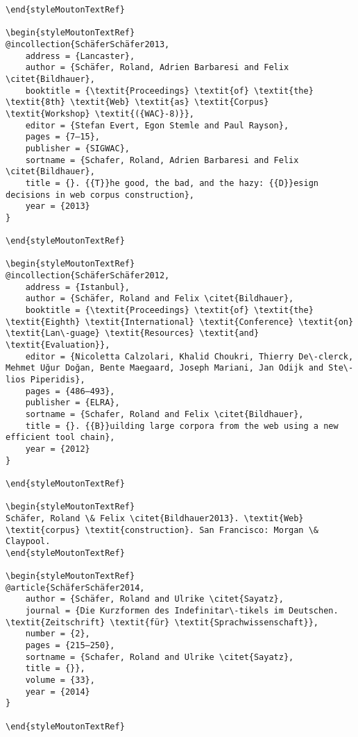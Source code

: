 \begin{styleMoutonHeadingRef}
\begin{verbatim}
\end{styleMoutonTextRef}

\begin{styleMoutonTextRef}
@incollection{SchäferSchäfer2013,
	address = {Lancaster},
	author = {Schäfer, Roland, Adrien Barbaresi and Felix \citet{Bildhauer},
	booktitle = {\textit{Proceedings} \textit{of} \textit{the} \textit{8th} \textit{Web} \textit{as} \textit{Corpus} \textit{Workshop} \textit{({WAC}-8)}},
	editor = {Stefan Evert, Egon Stemle and Paul Rayson},
	pages = {7–15},
	publisher = {SIGWAC},
	sortname = {Schafer, Roland, Adrien Barbaresi and Felix \citet{Bildhauer},
	title = {}. {{T}}he good, the bad, and the hazy: {{D}}esign decisions in web corpus construction},
	year = {2013}
}

\end{styleMoutonTextRef}

\begin{styleMoutonTextRef}
@incollection{SchäferSchäfer2012,
	address = {Istanbul},
	author = {Schäfer, Roland and Felix \citet{Bildhauer},
	booktitle = {\textit{Proceedings} \textit{of} \textit{the} \textit{Eighth} \textit{International} \textit{Conference} \textit{on} \textit{Lan\-guage} \textit{Resources} \textit{and} \textit{Evaluation}},
	editor = {Nicoletta Calzolari, Khalid Choukri, Thierry De\-clerck, Mehmet Uğur Doğan, Bente Maegaard, Joseph Mariani, Jan Odijk and Ste\-lios Piperidis},
	pages = {486–493},
	publisher = {ELRA},
	sortname = {Schafer, Roland and Felix \citet{Bildhauer},
	title = {}. {{B}}uilding large corpora from the web using a new efficient tool chain},
	year = {2012}
}

\end{styleMoutonTextRef}

\begin{styleMoutonTextRef}
Schäfer, Roland \& Felix \citet{Bildhauer2013}. \textit{Web} \textit{corpus} \textit{construction}. San Francisco: Morgan \& Claypool.
\end{styleMoutonTextRef}

\begin{styleMoutonTextRef}
@article{SchäferSchäfer2014,
	author = {Schäfer, Roland and Ulrike \citet{Sayatz},
	journal = {Die Kurzformen des Indefinitar\-tikels im Deutschen. \textit{Zeitschrift} \textit{für} \textit{Sprachwissenschaft}},
	number = {2},
	pages = {215–250},
	sortname = {Schafer, Roland and Ulrike \citet{Sayatz},
	title = {}},
	volume = {33},
	year = {2014}
}

\end{styleMoutonTextRef}


\end{verbatim}
\end{styleMoutonHeadingRef}
